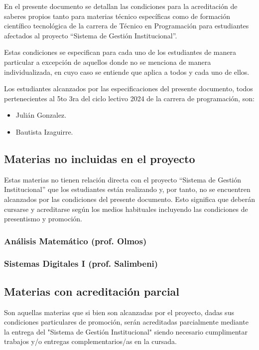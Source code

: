 En el presente documento se detallan las condiciones para la acreditación de saberes propios tanto para materias técnico específicas como de formación científico tecnológica de la carrera de Técnico en Programación para estudiantes afectados al proyecto “Sistema de Gestión Institucional”.

Estas condiciones se especifican para cada uno de los estudiantes de manera particular a excepción de aquellos donde no se menciona de manera individualizada, en cuyo caso se entiende que aplica a todos y cada uno de ellos. 

Los estudiantes alcanzados por las especificaciones del presente documento, todos pertenecientes al 5to 3ra del ciclo lectivo 2024 de la carrera de programación, son:

    \begin{itemize}
        \item Julián Gonzalez.
        \item Bautista Izaguirre.
    \end{itemize}

\subsection{Materias no incluidas en el proyecto}

Estas materias no tienen relación directa con el proyecto “Sistema de Gestión Institucional” que los estudiantes están realizando y, por tanto, no se encuentren alcanzados por las condiciones del presente documento. Esto significa que deberán cursarse y acreditarse según los medios habituales incluyendo las condiciones de presentismo y promoción.

\subsubsection{Análisis Matemático (prof. Olmos)}
\subsubsection{Sistemas Digitales I (prof. Salimbeni)}

\subsection{Materias con acreditación parcial}

Son aquellas materias que si bien son alcanzadas por el proyecto, dadas sus condiciones particulares de promoción, serán acreditadas parcialmente mediante la entrega del "Sistema de Gestión Institucional" siendo necesario cumplimentar trabajos y/o entregas complementarios/as en la cursada.

